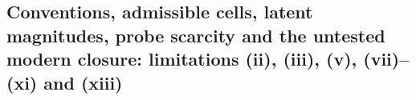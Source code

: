 \subsection{Conventions, admissible cells, latent magnitudes, probe scarcity and the untested modern
closure: limitations (ii), (iii), (v), (vii)--(xi) and (xiii)}
\label{sec:si-limitations}
